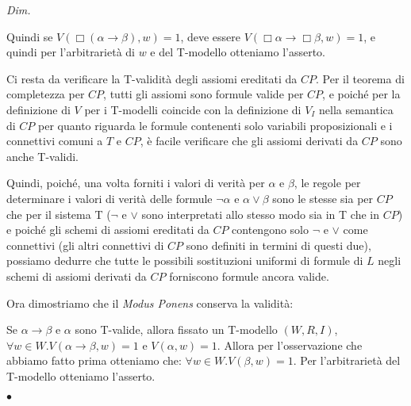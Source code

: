 \documentclass[a4paper, titlepage, 12pt]{report}
\newenvironment{proof}
    {\textit{Dim.}
    }
    {\begin{flushright}$\bullet$\end{flushright}
    }
\begin{document}
\begin{proof}
Quindi se $V(\Box(\alpha \rightarrow \beta), w) = 1$, deve essere $V(\Box \alpha \rightarrow \Box \beta, w) = 1$,
e quindi per l'arbitrarietà di $w$ e del T-modello otteniamo l'asserto.

Ci resta da verificare la T-validità degli assiomi ereditati da $CP$.
Per il teorema di completezza per $CP$, tutti gli assiomi sono formule valide per $CP$,
e poiché per la definizione di $V$ per i T-modelli coincide con la definizione di
$V_I$ nella semantica di $CP$ per quanto riguarda le formule contenenti solo
variabili proposizionali e i connettivi comuni a $T$ e $CP$, è facile
verificare che gli assiomi derivati da $CP$ sono anche T-validi.

Quindi, poiché, una volta forniti i valori di verità per $\alpha$ e $\beta$,
le regole per determinare i valori di verità delle formule $\neg \alpha$ e $\alpha \lor \beta$
sono le stesse sia per $CP$ che per il sistema T
($\neg$ e $\lor$ sono interpretati allo stesso modo sia in T che in $CP$) e poiché
gli schemi di assiomi ereditati da $CP$ contengono solo $\neg$ e $\lor$ come connettivi
(gli altri connettivi di $CP$ sono definiti in termini di questi due),
possiamo dedurre che tutte le possibili sostituzioni uniformi di formule di $L$
negli schemi di assiomi derivati da $CP$ forniscono formule ancora valide.

Ora dimostriamo che il \emph{Modus Ponens} conserva la validità:

Se $\alpha \rightarrow \beta$ e $\alpha$ sono T-valide, allora fissato un T-modello $(W, R, I)$,
$\forall w \in W. V(\alpha \rightarrow \beta, w) = 1$ e $V(\alpha, w) = 1$.
Allora per l'osservazione che abbiamo fatto prima otteniamo che:
$\forall w \in W. V(\beta, w) = 1$. Per l'arbitrarietà del T-modello otteniamo l'asserto.


\end{proof}
\end{document}
